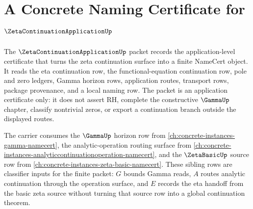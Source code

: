\chapter{A Concrete Naming Certificate for $\ZetaContinuationApplicationUp$}
\label{ch:concrete-instances-zetacontinuationapplication-namecert}

The $\ZetaContinuationApplicationUp$ packet records the application-level certificate that turns the zeta continuation surface into a finite NameCert object. It reads the eta continuation row, the functional-equation continuation row, pole and zero ledgers, Gamma horizon rows, application routes, transport rows, package provenance, and a local naming row. The packet is an application certificate only: it does not assert RH, complete the constructive $\GammaUp$ chapter, classify nontrivial zeros, or export a continuation branch outside the displayed routes.

The carrier consumes the $\GammaUp$ horizon row from \autoref{ch:concrete-instances-gamma-namecert}, the analytic-operation routing surface from \autoref{ch:concrete-instances-analyticcontinuationoperation-namecert}, and the $\ZetaBasicUp$ source row from \autoref{ch:concrete-instances-zeta-basic-namecert}. These sibling rows are classifier inputs for the finite packet: $G$ bounds Gamma reads, $A$ routes analytic continuation through the operation surface, and $E$ records the eta handoff from the basic zeta source without turning that source row into a global continuation theorem.


